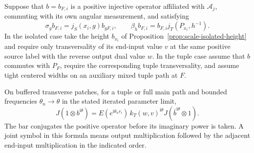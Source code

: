 \begin{lemma}\label{lem:heights-transfer}
Suppose that $b=b_{F,i}$ is a positive injective operator affiliated with
$\mathcal A_j$, commuting with its own angular measurement, and satisfying
\[
 \sigma_g b_{F,i}=j_S(x_i,g)b_{gF,i},\qquad
 \beta_h b_{F,i}=b_{F,i}j_T(P_{x_i},h^{-1}).
\]
In the isolated case take the height $b_{x_i}$ of
Proposition~\ref{prop:scale-isolated-height} and require only transversality of its end-input
value $v$ at the same positive source label with the reverse output dual
value $w$.  In the tuple case assume that $b$ commutes with $P_F$, require
the corresponding tuple transversality, and assume tight centered widths
on an auxiliary mixed tuple path at $F$.

On buffered transverse patches, for a tuple or full main path and bounded
frequencies $\theta_n\to\theta$ in the stated iterated parameter limit,
\begin{equation}\label{eq:input-15}
 J(1\otimes b^{\mathrm i\theta})
 =E(e^{\mathrm i\theta_n r_i})\,k_T(w,v)^{\mathrm i\theta}
 J(\bar b^{\mathrm i\theta}\otimes1).
\end{equation}
The bar conjugates the positive operator before its imaginary power is
taken.  A joint symbol in this formula means output multiplication followed
by the adjacent end-input multiplication in the indicated order.
\end{lemma}


